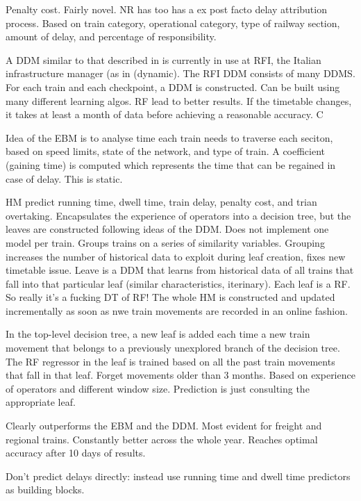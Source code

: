 \documentclass{article}
\begin{document}
Penalty cost. Fairly novel. NR has too has a ex post facto delay attribution process. Based on train category, operational category, type of railway section, amount of delay, and percentage of responsibility. 

A DDM similar to that described in \cite{oneto_et_al_2016} is currently in use at RFI, the Italian infrastructure manager (as in \cite{oneto_et_al_2018} (dynamic). The RFI DDM consists of many DDMS. For each train and each checkpoint, a DDM is constructed.  Can be built using many different learning algos. RF lead to better results.
If the timetable changes, it takes at least a month of data before achieving a reasonable accuracy. C

Idea of the EBM is to analyse time each train needs to traverse each seciton, based on speed limits, state of the network, and type of train. A coefficient (gaining time) is computed which represents the time that can be regained in case of delay. This is static. 

HM predict running time, dwell time, train delay, penalty cost, and trian overtaking. Encapsulates the experience of operators into a decision tree, but the leaves are constructed following ideas of the DDM. Does not implement one model per train. Groups trains on a series of similarity variables. Grouping increases the number of historical data to exploit during leaf creation, fixes new timetable issue. Leave is a DDM that learns from historical data of all trains that fall into that particular leaf (similar characteristics, iterinary). Each leaf is a RF. So really it's a fucking DT of RF!
The whole HM is constructed and updated incrementally as soon as nwe train movements are recorded in an online fashion. 

In the top-level decision tree, a new leaf is added each time a new train movement that belongs to a previously unexplored branch of the decision tree. The RF regressor in the leaf is trained based on all the past train movements that fall in that leaf. Forget movements older than 3 months. Based on experience of operators and different window size. Prediction is just consulting the appropriate leaf. 

Clearly outperforms the EBM and the DDM. Most evident for freight and regional trains. Constantly better across the whole year. Reaches optimal accuracy after 10 days of results.

Don't predict delays directly: instead use running time and dwell time predictors as building blocks. 
\end{document}
